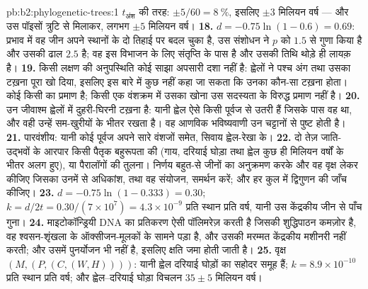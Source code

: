 \begin{solution}{pb:b2:phylogenetic-trees:1}
$t_{\text{अंश}}$ की तरह: $\pm 5/60 = \qty{8}{\%}$, इसलिए $\pm 3$ मिलियन वर्ष
--- और उस पॉइसों त्रुटि से मिलाकर, लगभग $\pm 5$ मिलियन वर्ष।
\textbf{18.} $d = -0.75\ln(1 - 0.6) = 0.69$: प्रभाव में वह जीन अपने
स्थानों के दो तिहाई पर बदल चुका है, उस संशोधन ने
$p$ को $1.5$ से गुणा किया है और उसकी ढाल $2.5$ है; वह इस
विभाजन के लिए संतृप्ति के पास है और उसकी तिथि थोड़े ही लायक़ है।
\textbf{19.} किसी लक्षण की अनुपस्थिति कोई साझा अपसारी दशा नहीं है:
ह्वेलों ने पश्च अंग तथा उसका टख़ना पूरा खो दिया, इसलिए इस बारे में कुछ नहीं
कहा जा सकता कि उनका कौन-सा टख़ना होता। कोई 
किसी  का प्रमाण है; किसी एक वंशक्रम में उसका खोना उस सदस्यता के
विरुद्ध प्रमाण नहीं है।
\textbf{20.} उन जीवाश्म ह्वेलों में दुहरी-घिरनी टख़ना है: यानी ह्वेल
ऐसे किसी पूर्वज से उतरी हैं जिसके पास वह था, और वही उन्हें
सम-खुरीयों के भीतर रखता है। वह आणविक भविष्यवाणी उन
चट्टानों से पुष्ट होती है।
\textbf{21.} पारवंशीय: यानी कोई पूर्वज अपने सारे वंशजों समेत,
सिवाय ह्वेल-रेखा के।
\textbf{22.} दो तेज़ जाति-उद्भवों के आरपार किसी पैतृक बहुरूपता की
 (गाय, दरियाई घोड़ा तथा ह्वेल कुछ ही
मिलियन वर्षों के भीतर अलग हुए), या पैरालॉगों की तुलना। निर्णय
बहुत-से जीनों का अनुक्रमण करके और वह वृक्ष लेकर कीजिए जिसका उनमें से अधिकांश, तथा
वह संयोजन, समर्थन करें; और हर कुल में द्विगुणन की जाँच कीजिए।
\textbf{23.} $d = -0.75\ln(1 - 0.333) = 0.30$; $k = d/2t =
0.30/(7\times 10^{7}) = 4.3\times 10^{-9}$ प्रति स्थान प्रति वर्ष, यानी उस
केंद्रकीय जीन से पाँच गुना।
\textbf{24.} माइटोकॉन्ड्रियी DNA का प्रतिकरण ऐसी पॉलिमरेज़ करती है जिसकी
शुद्धिपाठन कमज़ोर है, वह श्वसन-शृंखला के ऑक्सीजन-मूलकों के सामने पड़ा है,
और उसकी मरम्मत केंद्रकीय मशीनरी नहीं करती; और उसमें
पुनर्योजन भी नहीं है, इसलिए क्षति जमा होती जाती है।
\textbf{25.} वृक्ष $(M,(P,(C,(W,H))))$: यानी ह्वेल दरियाई घोड़ों का सहोदर
समूह हैं; $k = 8.9\times 10^{-10}$ प्रति स्थान प्रति वर्ष; और ह्वेल--दरियाई घोड़ा
विचलन $35 \pm 5$ मिलियन वर्ष।
\end{solution}

